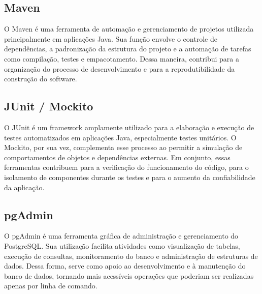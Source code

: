 \subsection{Maven}
O Maven é uma ferramenta de automação e gerenciamento de projetos utilizada principalmente em aplicações Java. Sua função envolve o controle de dependências, a padronização da estrutura do projeto e a automação de tarefas como compilação, testes e empacotamento. Dessa maneira, contribui para a organização do processo de desenvolvimento e para a reprodutibilidade da construção do software.

\subsection{JUnit / Mockito}
O JUnit é um framework amplamente utilizado para a elaboração e execução de testes automatizados em aplicações Java, especialmente testes unitários. O Mockito, por sua vez, complementa esse processo ao permitir a simulação de comportamentos de objetos e dependências externas. Em conjunto, essas ferramentas contribuem para a verificação do funcionamento do código, para o isolamento de componentes durante os testes e para o aumento da confiabilidade da aplicação.

\subsection{pgAdmin}
O pgAdmin é uma ferramenta gráfica de administração e gerenciamento do PostgreSQL. Sua utilização facilita atividades como visualização de tabelas, execução de consultas, monitoramento do banco e administração de estruturas de dados. Dessa forma, serve como apoio ao desenvolvimento e à manutenção do banco de dados, tornando mais acessíveis operações que poderiam ser realizadas apenas por linha de comando.


